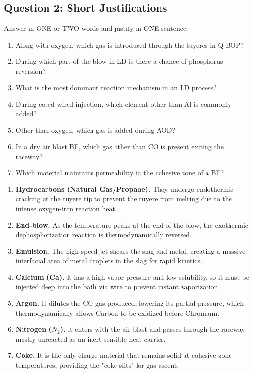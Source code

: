 \documentclass[11pt,a4paper]{article}
\begin{document}
\subsection{Question 2: Short Justifications}
\begin{questionbox}
Answer in ONE or TWO words and justify in ONE sentence:
\begin{enumerate}
    \item[(a)] Along with oxygen, which gas is introduced through the tuyeres in Q-BOP?
    \item[(b)] During which part of the blow in LD is there a chance of phosphorus reversion?
    \item[(c)] What is the most dominant reaction mechanism in an LD process?
    \item[(d)] During cored-wired injection, which element other than Al is commonly added?
    \item[(e)] Other than oxygen, which gas is added during AOD?
    \item[(f)] In a dry air blast BF, which gas other than CO is present exiting the raceway?
    \item[(g)] Which material maintains permeability in the cohesive zone of a BF?
\end{enumerate}
\end{questionbox}

\begin{solutionbox}
\begin{enumerate}
    \item[(a)] \textbf{Hydrocarbons (Natural Gas/Propane).} They undergo endothermic cracking at the tuyere tip to prevent the tuyere from melting due to the intense oxygen-iron reaction heat.
    \item[(b)] \textbf{End-blow.} As the temperature peaks at the end of the blow, the exothermic dephosphorization reaction is thermodynamically reversed.
    \item[(c)] \textbf{Emulsion.} The high-speed jet shears the slag and metal, creating a massive interfacial area of metal droplets in the slag for rapid kinetics.
    \item[(d)] \textbf{Calcium (Ca).} It has a high vapor pressure and low solubility, so it must be injected deep into the bath via wire to prevent instant vaporization.
    \item[(e)] \textbf{Argon.} It dilutes the CO gas produced, lowering its partial pressure, which thermodynamically allows Carbon to be oxidized before Chromium.
    \item[(f)] \textbf{Nitrogen ($N_2$).} It enters with the air blast and passes through the raceway mostly unreacted as an inert sensible heat carrier.
    \item[(g)] \textbf{Coke.} It is the only charge material that remains solid at cohesive zone temperatures, providing the "coke slits" for gas ascent.
\end{enumerate}
\end{solutionbox}
\end{document}
